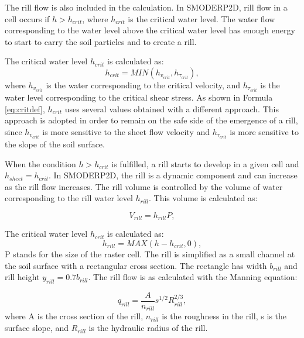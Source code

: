 The rill flow is also included in the calculation. In SMODERP2D, rill flow in a
cell occurs if $h>h_{crit}$, where $h_{crit}$ is the critical water level. The
water flow corresponding to the water level above the critical water level has
enough energy to start to carry the soil particles and to create a rill.

The critical water level $h_{crit}$ is calculated as:
\begin{equation}
  h_{crit} = MIN(h_{v_{crit}},h_{\tau_{crit}}),
  \label{eq:critdef}
\end{equation}
where $h_{v_{crit}}$ is the water corresponding to the critical velocity, and
$h_{\tau_{crit}}$ is the water level corresponding to the critical shear
stress.  As shown in Formula \ref{eq:critdef}, $h_{crit}$ uses several values
obtained with a different approach. This approach is adopted in order to remain
on the safe side of the emergence of a rill, since $h_{v_{crit}}$ is more
sensitive to the sheet flow velocity and $h_{\tau_{crit}}$ is more sensitive to
the slope of the soil surface. 

When the condition $h>h_{crit}$ is fulfilled, a rill starts to develop in a
given cell and $h_{sheet}=h_{crit}$. In SMODERP2D, the rill is a dynamic component and
can increase as the rill flow increases. The rill volume is controlled by the
volume of water corresponding to the rill water level $h_{rill}$. This volume is
calculated as:


\begin{equation}
  V_{rill} = h_{rill}P,
  \label{eq:rillvol}
\end{equation}

The critical water level $h_{crit}$ is calculated as:
\begin{equation}
  h_{rill} = MAX(h-h_{crit},0),
  \label{eq:hrill}
\end{equation}
P stands for the size of the raster cell. The rill is simplified as a small
channel at the soil surface with a rectangular cross section. The rectangle has
width $b_{rill}$ and rill height $y_{rill} = 0.7b_{rill}$. The rill flow is as
calculated with the Manning equation: 

\begin{equation}
    q_{rill} = \frac{A}{n_{rill}} s^{1/2} R_{rill}^{2/3},
  \label{eq:rillflow}
\end{equation}
where A is the cross section of the rill,  $n_{rill}$ is the roughness in the
rill, s is the surface slope, and  $R_{rill}$  is the hydraulic radius of the
rill. 

